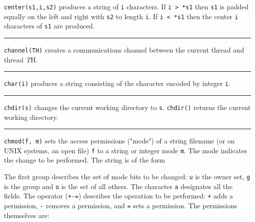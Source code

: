 \noindent
{}\texttt{center(s1,i,s2)} produces a
string of \texttt{i} characters. If \texttt{i {\textgreater} *s1} then
\texttt{s1} is padded equally on the left and right with \texttt{s2} to
length \texttt{i}. If \texttt{i {\textless} *s1} then the center
\texttt{i} characters of \texttt{s1} are produced.

\bigskip\hrule\vspace{0.1cm}

\noindent
{}\texttt{channel(TH)} creates a communications channel
between the current thread and thread {\textit TH}.

\bigskip\hrule\vspace{0.1cm}

\noindent
{}\texttt{char(i)} produces a string consisting of the
character encoded by integer \texttt{i}.

\bigskip\hrule\vspace{0.1cm}

\noindent
{}\texttt{chdir(s)} changes the current
working directory to \texttt{s}. \texttt{chdir()} returns the current
working directory.

\bigskip\hrule\vspace{0.1cm}

\noindent
{}\texttt{chmod(f,
m)} sets the access permissions ("mode") of
a string filename (or on UNIX systems, an open file) \texttt{f} to a
string or integer mode \texttt{m}. The mode indicates the change to be
performed. The string is of the form

\iconcode{
\>   [ugoa]*[+-=][rwxRWXstugo]* }

The first group describes the set of mode bits to be changed: \texttt{u}
is the owner set, \texttt{g} is the group and \texttt{o} is the set of
all others. The character \texttt{a} designates all the fields. The
operator (\texttt{+-=}) describes the operation to be performed:
\texttt{+} adds a permission, \texttt{{}-} removes a permission, and
\texttt{=} sets a permission. The permissions themselves are: 

